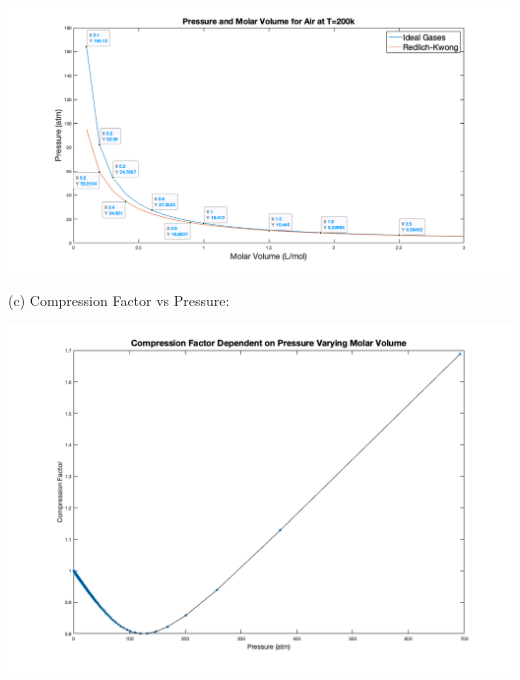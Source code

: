 \documentclass[11pt]{article}
\begin{document}
\begin{center}
    \includegraphics[width=15cm]{2.2.1.png}
\end{center}
\newpage
(c) Compression Factor vs Pressure:
\begin{center}
    \includegraphics[width=17cm]{123.png}
\end{center}
\end{document}
